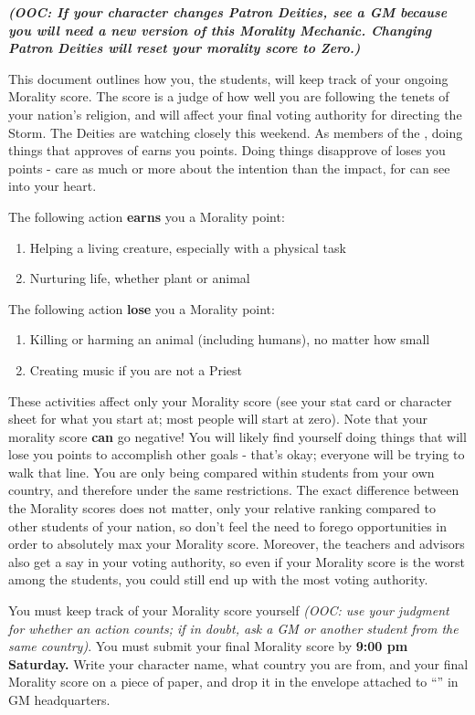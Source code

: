 \documentclass[green]{GL2020}
\begin{document}
\name{\gCoSStudentMorality{}}

\emph{\textbf{(OOC: If your character changes Patron Deities, see a GM because you will need a new version of this Morality Mechanic. Changing Patron Deities will reset your morality score to Zero.)}}

This document outlines how you, the students, will keep track of your ongoing Morality score. The score is a judge of how well you are following the tenets of your nation’s religion, and will affect your final voting authority for directing the Storm. The Deities are watching closely this weekend. As members of the \pFarm{}, doing things that \cFarmGod{} approves of earns you points. Doing things \cFarmGod{\they} disapprove\cFarmGod{\plural} of loses you points - \cFarmGod{\they} care as much or more about the intention than the impact, for \cFarmGod{\they} can see into your heart.

The following action \textbf{earns} you a Morality point:
\begin{enumerate}
  \item Helping a living creature, especially with a physical task
  \item Nurturing life, whether plant or animal
\end{enumerate}

The following action \textbf{lose} you a Morality point:
\begin{enumerate}
  \item Killing or harming an animal (including humans), no matter how small
  \item Creating music if you are not a Priest
\end{enumerate}

These activities affect only your Morality score (see your stat card or character sheet for what you start at; most people will start at zero).  Note that your morality score \textbf{can} go negative! You will likely find yourself doing things that will lose you points to accomplish other goals - that’s okay; everyone will be trying to walk that line. You are only being compared within students from your own country, and therefore under the same restrictions. The exact difference between the Morality scores does not matter, only your relative ranking compared to other students of your nation, so don’t feel the need to forego opportunities in order to absolutely max your Morality score. Moreover, the teachers and advisors also get a say in your voting authority, so even if your Morality score is the worst among the students, you could still end up with the most voting authority. 

You must keep track of your Morality score yourself \emph{(OOC: use your judgment for whether an action counts; if in doubt, ask a GM or another student from the same country)}. You must submit your final Morality score by \textbf{9:00 pm Saturday.} Write your character name, what country you are from, and your final Morality score on a piece of paper, and drop it in the envelope attached to “\sSignV{}” in GM headquarters. 
\end{document}
